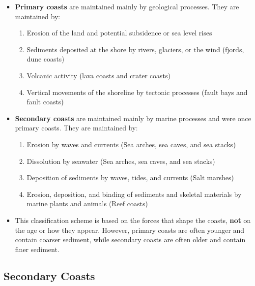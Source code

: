 \documentclass{article}
\begin{document}
\begin{itemize}
	\item \textbf{Primary coasts} are maintained mainly by geological processes. They are maintained by:
	\begin{enumerate}
		\item Erosion of the land and potential subsidence or sea level rises
		\item Sediments deposited at the shore by rivers, glaciers, or the wind (fjords, dune coasts)
		\item Volcanic activity (lava coasts and crater coasts)
		\item Vertical movements of the shoreline by tectonic processes (fault bays and fault coasts)
	\end{enumerate}
	
	\item \textbf{Secondary coasts} are maintained mainly by marine processes and were once primary coasts. They are maintained by:
	\begin{enumerate}
		\item Erosion by waves and currents (Sea arches, sea caves, and sea stacks)
		\item Dissolution by seawater (Sea arches, sea caves, and sea stacks)
		\item Deposition of sediments by waves, tides, and currents (Salt marshes)
		\item Erosion, deposition, and binding of sediments and skeletal materials by marine plants and animals (Reef coasts)
	\end{enumerate} 
	\item This classification scheme is based on the forces that shape the coasts, \textbf{not} on the age or how they appear. However, primary coasts are often younger and contain coarser sediment, while secondary coasts are often older and contain finer sediment.
\end{itemize}

	\subsection{Secondary Coasts}
	
\end{document}
